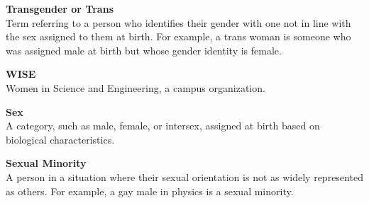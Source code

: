 \begin{titlepage}
\noindent\textbf{Transgender or Trans}\\
Term referring to a person who identifies their gender with one not in line with the sex assigned to them at birth. For example, a trans woman is someone who was assigned male at birth but whose gender identity is female.\vspace*{\baselineskip}

\noindent\textbf{WISE}\\
Women in Science and Engineering, a campus organization.\vspace*{\baselineskip}

\noindent\textbf{Sex}\\
A category, such as male, female, or intersex, assigned at birth based on biological characteristics.\vspace*{\baselineskip}

\noindent\textbf{Sexual Minority}\\
A person in a situation where their sexual orientation is not as widely represented as others. For example, a gay male in physics is a sexual minority.
\end{titlepage}








